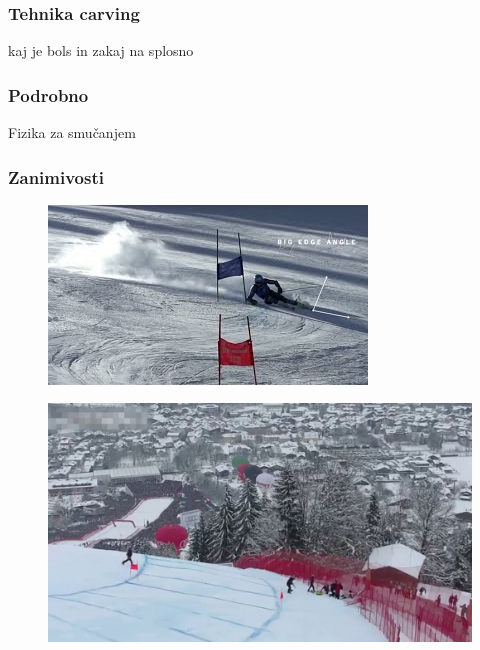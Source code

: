 \documentclass{beamer}
\begin{document}
\begin{frame}
    \frametitle{Tehnika carving}
    kaj je bols in zakaj na splosno
\end{frame}

\begin{frame}
    \frametitle{Podrobno}
    Fizika za smučanjem
\end{frame}

\begin{frame}
    \frametitle{Zanimivosti}

    \begin{figure}[h]
        \centering
        \href{https://www.youtube.com/watch?v=gz-irSJGehY}{\includegraphics[width=0.8\linewidth]{../images/slika-1.jpg}}
        \label{fig:external_link}
      \end{figure}
      
\begin{figure}[h]
        \centering
        \href{https://www.youtube.com/watch?v=vM_UU11MMH0}{\includegraphics[width=0.8\linewidth]{../images/slika-2.jpg}}
        \label{fig:external_link}
    \end{figure}

\end{frame}
\end{document}
